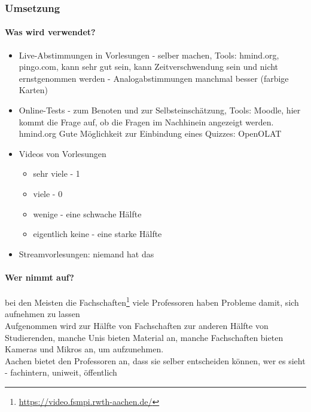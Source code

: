 	\subsubsection*{Umsetzung}
		\paragraph{Was wird verwendet?}
			\begin{itemize}
				\item Live-Abstimmungen in Vorlesungen - selber machen, Tools: hmind.org, pingo.com,
				kann sehr gut sein,
				kann Zeitverschwendung sein und nicht ernstgenommen werden - Analogabstimmungen manchmal besser (farbige Karten)

				\item Online-Tests - zum Benoten und zur Selbsteinschätzung, Tools: Moodle,
				hier kommt die Frage auf, ob die Fragen im Nachhinein angezeigt werden.
				hmind.org
				Gute Möglichkeit zur Einbindung eines Quizzes: OpenOLAT

				\item Videos von Vorlesungen
					\begin{itemize}
						\item sehr viele - 1
						\item viele - 0
						\item wenige - eine schwache Hälfte
						\item eigentlich keine - eine starke Hälfte
					\end{itemize}

				\item Streamvorlesungen: niemand hat das
			\end{itemize}

	\paragraph{Wer nimmt auf?}
		bei den Meisten die Fachschaften\footnote{\url{https://video.fsmpi.rwth-aachen.de/}}
		viele Professoren haben Probleme damit, sich aufnehmen zu lassen \\

		Aufgenommen wird zur Hälfte von Fachschaften zur anderen Hälfte von Studierenden,
		manche Unis bieten Material an,
		manche Fachschaften bieten Kameras und Mikros an, um aufzunehmen. \\

		Aachen bietet den Professoren an, dass sie selber entscheiden können, wer es sieht - fachintern, uniweit, öffentlich\\

